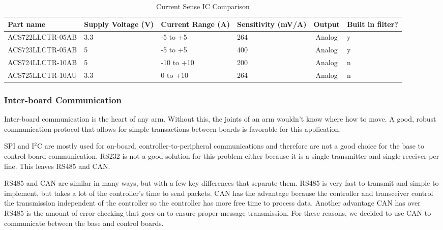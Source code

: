 \begin{table}[H]
	\centering
	\caption{Current Sense IC Comparison}
	\begin{tabular}{|p{4.2cm}|p{1.5cm}|p{2cm}|p{1.7cm}|c|p{1.4cm}|}
\hline
Part name & Supply Voltage (V) & Current Range (A) & Sensitivity (mV/A) & Output & Built in filter? \\
\hline

ACS722LLCTR-05AB & 3.3 & -5 to +5 & 264 & Analog & y \\

ACS723LLCTR-05AB & 5 & -5 to +5 & 400 & Analog & y \\

ACS724LLCTR-10AB & 5 & -10 to +10 & 200 & Analog & n \\

ACS725LLCTR-10AU & 3.3 & 0 to +10 & 264 & Analog & n \\
\hline

\end{tabular}

	\label{tbl:Current Sense IC Comparison}
\end{table}

\subsubsection{Inter-board Communication}
Inter-board communication is the heart of any arm. Without this, the joints of an arm wouldn't know where how to move. A good, robust communication protocol that allows for simple transactions between boards is favorable for this application.

\noindent SPI and I$^2$C are mostly used for on-board, controller-to-peripheral communications and therefore are not a good choice for the base to control board communication. RS232 is not a good solution for this problem either because it is a single transmitter and single receiver per line. This leaves RS485 and CAN.

\noindent RS485 and CAN are similar in many ways, but with a few key differences that separate them. RS485 is very fast to transmit and simple to implement, but takes a lot of the controller's time to send packets. CAN has the advantage because the controller and transceiver control the transmission independent of the controller so the controller has more free time to process data. Another advantage CAN has over RS485 is the amount of error checking that goes on to ensure proper message transmission. For these reasons, we decided to use CAN to communicate between the base and control boards.


